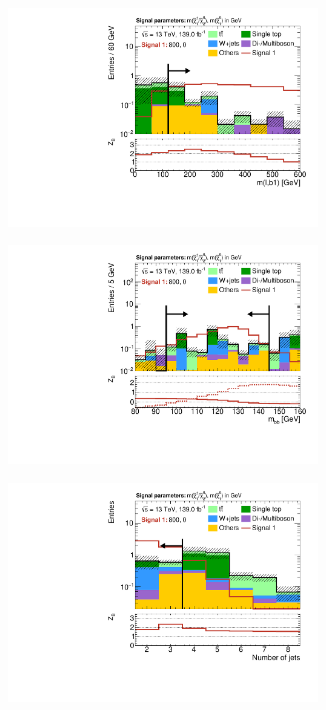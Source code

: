 \begin{figure}
\begin{subfigure}[b]{0.5\linewidth}
	\end{subfigure}\hfill
	\begin{subfigure}[b]{0.5\linewidth}
		\centering\includegraphics[width=0.9\textwidth]{N-1_cut_scan/n1_800_0/mlb1}
	\end{subfigure}\hfill
	\begin{subfigure}[b]{0.5\linewidth}
		\centering\includegraphics[width=0.9\textwidth]{N-1_cut_scan/n1_800_0/mbb_both}
	\end{subfigure}\hfill
	\begin{subfigure}[b]{0.5\linewidth}
		\centering\includegraphics[width=0.9\textwidth]{N-1_cut_scan/n1_800_0/nJet30}
	\end{subfigure}


\end{figure}
